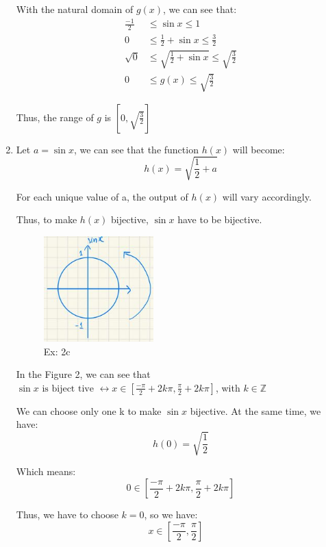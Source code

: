 \documentclass{article}
\begin{document}
\begin{enumerate}[label=({\alph*})]
        With the natural domain of \(g(x)\), we can see that:
        \begin{align*}
            \frac{-1}{2} &\leq \sin{x} \leq 1\\
            0 & \leq \frac{1}{2} + \sin{x} \leq \frac{3}{2}\\
            \sqrt{0} & \leq \sqrt{\frac{1}{2} + \sin{x}} \leq \sqrt{\frac{3}{2}}\\
            0 & \leq g(x) \leq \sqrt{\frac{3}{2}}
        \end{align*}
        
        Thus, the range of \(g\) is \([0, \sqrt{\frac{3}{2}}]\)

        \item

        Let \(a = \sin{x}\), we can see that the function \(h(x)\) will become:
        \[h(x) = \sqrt{\frac{1}{2} + a}\]

        For each unique value of a, the output of \(h(x)\) will vary accordingly.

        Thus, to make \(h(x)\) bijective, \(\sin{x}\) have to be bijective.

        \begin{figure}[ht]
			\centering
				 \includegraphics[width=0.4\textwidth]{fig2.jpg} 
				 \caption{Ex: 2c}
				 \label{Ex:2c}
		\end{figure}

        In the Figure 2, we can see that \(\sin{x} \text{ is biject tive }\leftrightarrow  x \in [\frac{-\pi}{2} + 2k\pi, \frac{\pi}{2} + 2k\pi]\), with \(k \in \mathbb{Z}\)

        We can choose only one k to make \(\sin{x}\) bijective. At the same time, we have:
        \[h(0) = \sqrt{\frac{1}{2}}\]
        
        Which means:
         \[0 \in [\frac{-\pi}{2} + 2k\pi, \frac{\pi}{2} + 2k\pi]\]

        Thus, we have to choose \(k = 0\), so we have:
        \begin{equation}
            x \in [\frac{-\pi}{2}, \frac{\pi}{2}] \quad \label{2:c:1}
        \end{equation}



\end{enumerate}
\end{document}
